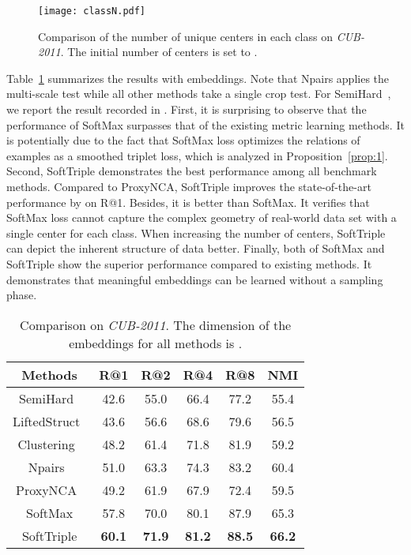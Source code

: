 \documentclass[10pt,twocolumn,letterpaper]{article}
\begin{document}
\begin{figure*}[!ht]
\centering
\texttt{[image: classN.pdf]}
\caption{Comparison of the number of unique centers in each class on \textit{CUB-2011}. The initial number of centers is set to .\label{fig:classn}}
\end{figure*}

Table~\ref{ta:birds64} summarizes the results with  embeddings. Note that Npairs applies the multi-scale test while all other methods take a single crop test. For SemiHard~\cite{SchroffKP15}, we report the result recorded in \cite{SongJR017}. First, it is surprising to observe that the performance of SoftMax surpasses that of the existing metric learning methods. It is potentially due to the fact that SoftMax loss optimizes the relations of examples as a smoothed triplet loss, which is analyzed in Proposition~\ref{prop:1}. Second, SoftTriple demonstrates the best performance among all benchmark methods. Compared to ProxyNCA, SoftTriple improves the state-of-the-art performance by  on R@1. Besides, it is  better than SoftMax. It verifies that SoftMax loss cannot capture the complex geometry of real-world data set with a single center for each class. When increasing the number of centers, SoftTriple can depict the inherent structure of data better. Finally, both of SoftMax and SoftTriple show the superior performance compared to existing methods. It demonstrates that meaningful embeddings can be learned without a sampling phase.

\begin{table}[!ht]
\centering
\small
\caption{Comparison on \textit{CUB-2011}. The dimension of the embeddings for all methods is .}\label{ta:birds64}
\begin{tabular}{c|ccccc}
Methods&R@1&R@2&R@4&R@8&NMI\\\hline
SemiHard~\cite{SchroffKP15}&42.6&55.0&66.4&77.2&55.4\\
LiftedStruct~\cite{SongXJS16}&43.6&56.6&68.6&79.6&56.5\\
Clustering~\cite{SongJR017}&48.2&61.4&71.8&81.9&59.2\\
Npairs~\cite{Sohn16}&51.0&63.3&74.3&83.2&60.4\\
ProxyNCA~\cite{Attias17}&49.2&61.9&67.9&72.4&59.5\\\hline
SoftMax&57.8&70.0&80.1&87.9&65.3\\
SoftTriple&\textbf{60.1}&\textbf{71.9}&\textbf{81.2}&\textbf{88.5}&\textbf{66.2}\\
\end{tabular}
\end{table}
\end{document}
